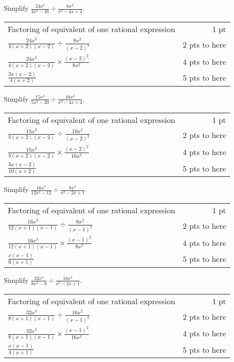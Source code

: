 {
	Simplify $\displaystyle \frac{24x^3}{4x^2-16}\div\frac{8x^2}{x^2-4x+4}$.
}
{
	\begin{tabular}{l r}
	Factoring of equivalent of one rational expression & 1 pt \\
	$\frac{24x^3}{4(x+2)(x-2)} \div \frac{8x^2}{(x-2)^2}$ & 2 pts to here\\
	$\frac{24x^3}{4(x+2)(x-2)} \times \frac{(x-2)^2}{8x^2}$ & 4 pts to here\\
	$\frac{3x(x-2)}{4(x+2)}$ & 5 pts to here
	\end{tabular}
}

{
	Simplify $\displaystyle \frac{15x^3}{5x^2-20}\div\frac{10x^2}{x^2-4x+4}$.
}
{
	\begin{tabular}{l r}
	Factoring of equivalent of one rational expression & 1 pt \\
	$\frac{15x^3}{5(x+2)(x-2)} \div \frac{10x^2}{(x-2)^2}$ & 2 pts to here\\
	$\frac{15x^3}{5(x+2)(x-2)} \times \frac{(x-2)^2}{10x^2}$ & 4 pts to here\\
	$\frac{3x(x-2)}{10(x+2)}$ & 5 pts to here
	\end{tabular}
}

{
	Simplify $\displaystyle \frac{16x^3}{12x^2-12}\div\frac{8x^2}{x^2-2x+1}$.
}
{
	\begin{tabular}{l r}
	Factoring of equivalent of one rational expression & 1 pt \\
	$\frac{16x^3}{12(x+1)(x-1)} \div \frac{8x^2}{(x-1)^2}$ & 2 pts to here\\
	$\frac{16x^3}{12(x+1)(x-1)} \times \frac{(x-1)^2}{8x^2}$ & 4 pts to here\\
	$\frac{x(x-1)}{6(x+1)}$ & 5 pts to here
	\end{tabular}
}

{
	Simplify $\displaystyle \frac{32x^3}{8x^2-8}\div\frac{16x^2}{x^2-2x+1}$.
}
{
	\begin{tabular}{l r}
	Factoring of equivalent of one rational expression & 1 pt \\
	$\frac{32x^3}{8(x+1)(x-1)} \div \frac{16x^2}{(x-1)^2}$ & 2 pts to here\\
	$\frac{32x^3}{8(x+1)(x-1)} \times \frac{(x-1)^2}{16x^2}$ & 4 pts to here\\
	$\frac{x(x-1)}{4(x+1)}$ & 5 pts to here
	\end{tabular}
}
